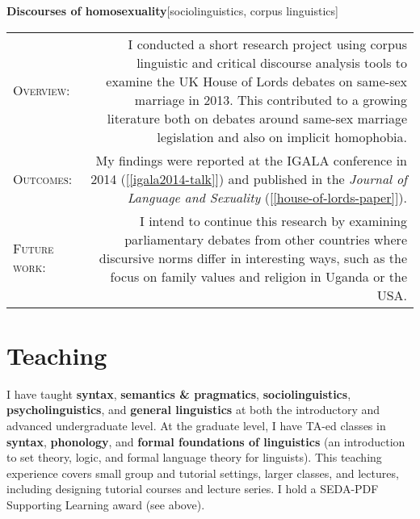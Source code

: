 \documentclass[11pt,a4paper,twoside]{article}
\makeatletter
\newlength{\rulelength}%
\newcommand{\REx}[2]{%
\vspace*{0.1\baselineskip}%
{\large\textbf{#1}\hfill\textnormal{[#2]}}%
\vspace*{0.5\baselineskip}%
}
\newenvironment{cvsection}{%
  \setlength{\extrarowheight}{0.70ex}
  \begin{longtable}[l]{@{} L R @{}}
}{%
  \end{longtable}
}
\newcommand{\sref}[1]{[\ref{#1}]}
\newcommand{\subhead}[1]{%
\textsc{#1}:%
}
\makeatother
\begin{document}
\REx{Discourses of homosexuality}{sociolinguistics, corpus linguistics}
\begin{cvsection}
  \subhead{Overview} &%
  I conducted a short research project using corpus linguistic and critical discourse analysis tools to examine the UK House of Lords debates on same-sex marriage in 2013. This contributed to a growing literature both on debates around same-sex marriage legislation and also on implicit homophobia.%
\\
  \subhead{Outcomes} &%
  My findings were reported at the IGALA conference in 2014 (\sref{igala2014-talk}) and published in the \textit{Journal of Language and Sexuality} (\sref{house-of-lords-paper}).%
\\
  \subhead{Future work} &%
  I intend to continue this research by examining parliamentary debates from other countries where discursive norms differ in interesting ways, such as the focus on family values and religion in Uganda or the USA.
\end{cvsection}


\newpage

\section*{Teaching}

I have taught \textbf{syntax}, \textbf{semantics \& pragmatics}, \textbf{sociolinguistics}, \textbf{psycholinguistics}, and \textbf{general linguistics} at both the introductory and advanced undergraduate level. At the graduate level, I have TA-ed classes in \textbf{syntax}, \textbf{phonology}, and \textbf{formal foundations of linguistics} (an introduction to set theory, logic, and formal language theory for linguists). This teaching experience covers small group and tutorial settings, larger classes, and lectures, including designing tutorial courses and lecture series. I hold a SEDA-PDF Supporting Learning award (see above).
\end{document}
